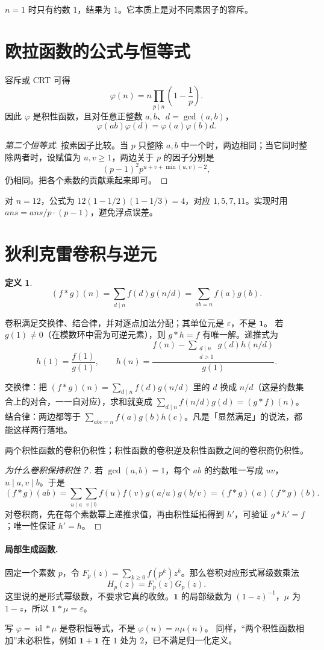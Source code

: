 \documentclass[UTF8,a4paper,11pt,oneside,openany,fontset=fandol]{ctexbook}
\theoremstyle{definition}
\newtheorem{definition}{定义}[chapter]
\newcommand{\eps}{\varepsilon}
\newcommand{\one}{\mathbf 1}
\newcommand{\id}{\operatorname{id}}
\begin{document}
$n=1$ 时只有约数 $1$，结果为 $1$。它本质上是对不同素因子的容斥。


\section{欧拉函数的公式与恒等式}
容斥或 CRT 可得
\[
 \varphi(n)=n\prod_{p\mid n}\left(1-\frac1p\right).
\]
因此 $\varphi$ 是积性函数，且对任意正整数 $a,b$、$d=\gcd(a,b)$，
\[
 \varphi(ab)\varphi(d)=\varphi(a)\varphi(b)d.
\]

\begin{proof}[第二个恒等式]
按素因子比较。当 $p$ 只整除 $a,b$ 中一个时，两边相同；当它同时整除两者时，设赋值为 $u,v\ge1$，两边关于 $p$ 的因子分别是
\[
 (p-1)^2p^{u+v+\min(u,v)-2},
\]
仍相同。把各个素数的贡献乘起来即可。
\end{proof}
对 $n=12$，公式为 $12(1-1/2)(1-1/3)=4$，对应 $1,5,7,11$。实现时用 $ans=ans/p\cdot(p-1)$，避免浮点误差。


\section{狄利克雷卷积与逆元}
\begin{definition}
\[
 (f*g)(n)=\sum_{d\mid n}f(d)g(n/d)=\sum_{ab=n}f(a)g(b).
\]
\end{definition}
卷积满足交换律、结合律，并对逐点加法分配；其单位元是 $\eps$，不是 $\one$。
若 $g(1)\ne0$（在模数环中需为可逆元素），则 $g*h=f$ 有唯一解。递推式为
\[
 h(1)=\frac{f(1)}{g(1)},\qquad
 h(n)=\frac{f(n)-\sum_{\substack{d\mid n\\d>1}}g(d)h(n/d)}{g(1)}.
\]

\begin{tip}[自己验证一次只要两行]
交换律：把 $(f*g)(n)=\sum_{d\mid n}f(d)g(n/d)$ 里的 $d$ 换成 $n/d$（这是约数集合上的对合，一一自对应），求和就变成 $\sum_{d\mid n}f(n/d)g(d)=(g*f)(n)$。结合律：两边都等于 $\sum_{abc=n}f(a)g(b)h(c)$。凡是「显然满足」的说法，都能这样两行落地。
\end{tip}

两个积性函数的卷积仍积性；积性函数的卷积逆及积性函数之间的卷积商仍积性。


\begin{proof}[为什么卷积保持积性？]
若 $\gcd(a,b)=1$，每个 $ab$ 的约数唯一写成 $uv$，$u\mid a,v\mid b$。于是
\[
 (f*g)(ab)=\sum_{u\mid a}\sum_{v\mid b}f(u)f(v)g(a/u)g(b/v)
 =(f*g)(a)(f*g)(b).
\]
对卷积商，先在每个素数幂上递推求值，再由积性延拓得到 $h'$，可验证 $g*h'=f$；唯一性保证 $h'=h$。
\end{proof}
\paragraph{局部生成函数.}
固定一个素数 $p$，令 $F_p(z)=\sum_{k\ge0}f(p^k)z^k$。那么卷积对应形式幂级数乘法
\[
 H_p(z)=F_p(z)G_p(z).
\]
这里说的是形式幂级数，不要求它真的收敛。$\one$ 的局部级数为 $(1-z)^{-1}$，$\mu$ 为 $1-z$，所以 $\one*\mu=\eps$。
\begin{pitfall}
写 $\varphi=\id*\mu$ 是卷积恒等式，不是 $\varphi(n)=n\mu(n)$。
同样，“两个积性函数相加”未必积性，例如 $\one+\one$ 在 $1$ 处为 $2$，已不满足归一化定义。
\end{pitfall}
\end{document}
